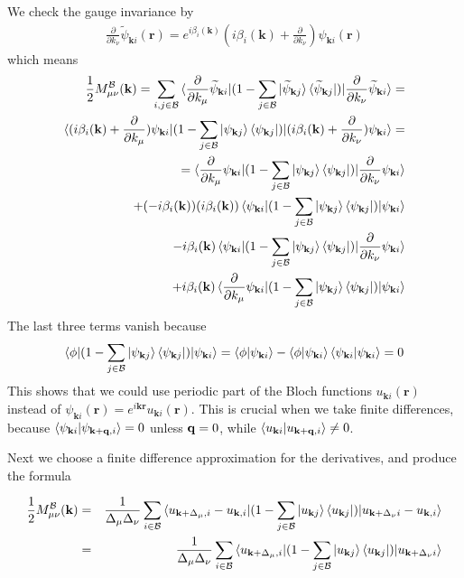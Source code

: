\documentclass[onecolumn, prb,preprintnumbers,amsmath,amssymb,floatfix]{revtex4}
\renewcommand{\vr}{{\mathbf{r}}}
\newcommand{\vk}{{\mathbf{k}}}
\newcommand{\cb}{{\cal B}}
\begin{document}
We check the gauge invariance by
\begin{eqnarray}
  \frac{\partial}{\partial k_{\nu}}\widetilde{\psi}_{\vk i}(\vr)=
  e^{i\beta_i(\vk)} ({i\beta_i(\vk)}+\frac{\partial}{\partial k_{\nu}})\psi_{\vk i}(\vr)
\end{eqnarray}  
which means
\begin{eqnarray}
 \frac{1}{2} M_{\mu\nu}^{\cb}(\vk)  =
\sum_{i,j\in \cb}
  \braket{\frac{\partial}{\partial k_{\mu}}\widetilde{\psi}_{\vk i}|(1-\sum_{j\in \cb}\ket{\widetilde{\psi}_{\vk j}}\bra{\widetilde{\psi}_{\vk j}})|\frac{\partial}{\partial k_{\nu}}\widetilde{\psi}_{\vk i}}=
\\
\braket{({i\beta_i(\vk)}+\frac{\partial}{\partial k_{\mu}}) \psi_{\vk i}|(1-\sum_{j\in \cb}  \ket{\psi_{\vk j}}\bra{\psi_{\vk j}})|  ({i\beta_i(\vk)}+\frac{\partial}{\partial k_{\nu}})\psi_{\vk i}}=\\
=\braket{\frac{\partial}{\partial k_{\mu}} \psi_{\vk i}|(1-\sum_{j\in \cb}  \ket{\psi_{\vk j}}\bra{\psi_{\vk j}})|\frac{\partial}{\partial k_{\nu}}\psi_{\vk i}}\\
+({-i\beta_i(\vk)})({i\beta_i(\vk)})  \braket{\psi_{\vk i}|(1-\sum_{j\in \cb}  \ket{\psi_{\vk j}}\bra{\psi_{\vk j}})| \psi_{\vk i}}\\
{-i\beta_i(\vk)}\braket{ \psi_{\vk i}|(1-\sum_{j\in \cb}  \ket{\psi_{\vk j}}\bra{\psi_{\vk j}})| \frac{\partial}{\partial k_{\nu}}\psi_{\vk i}}\\
+{i\beta_i(\vk)}\braket{\frac{\partial}{\partial k_{\mu}} \psi_{\vk i}|(1-\sum_{j\in \cb}  \ket{\psi_{\vk j}}\bra{\psi_{\vk j}})|\psi_{\vk i}}
\end{eqnarray}
The last three terms vanish because
$$\braket{\phi|(1-\sum_{j\in \cb}  \ket{\psi_{\vk j}}\bra{\psi_{\vk j}})|\psi_{\vk i}}=
\braket{\phi|\psi_{\vk i}}
-\braket{\phi|\psi_{\vk i}}\braket{\psi_{\vk i}|\psi_{\vk i}}=0$$
%
This shows that we could use periodic part of the Bloch functions $u_{\vk i}(\vr)$ instead of $\psi_{\vk i}(\vr)=e^{i\vk\vr}u_{\vk i}(\vr)$. This is crucial when we take finite differences, because
$\braket{\psi_{\vk i}|\psi_{\vk+\vq,i}}=0$ unless ${\mathbf{q}}=0$, while 
$\braket{u_{\vk i}|u_{\vk+\vq,i}}\ne 0$.

Next we choose a finite difference approximation for the derivatives, and produce the formula


\begin{eqnarray}
\frac{1}{2} M_{\mu\nu}^{\cb}(\vk)  &=&\frac{1}{\Delta_\mu\Delta_\nu}\sum_{i\in \cb}\braket{ u_{\vk+\Delta_\mu,i}-u_{\vk,i}|(1-\sum_{j\in \cb}\ket{u_{\vk j}}\bra{u_{\vk j}})|u_{\vk+\Delta_\nu i}-u_{\vk,i}}\\
&=&  \frac{1}{\Delta_\mu\Delta_\nu}\sum_{i\in \cb}\braket{ u_{\vk+\Delta_\mu,i}|(1-\sum_{j\in \cb}\ket{u_{\vk j}}\bra{u_{\vk j}})|u_{\vk+\Delta_\nu i}}
\end{eqnarray}
\end{document}
